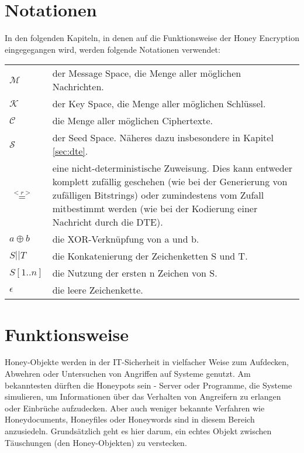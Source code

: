 \section{Notationen}

In den folgenden Kapiteln, in denen auf die Funktionsweise der Honey Encryption eingegegangen wird, werden folgende Notationen verwendet:

\begin{tabular}{lp{14cm}}
\(\mathcal{M}\) & der Message Space, die Menge aller möglichen Nachrichten. \\ 
\(\mathcal{K}\) & der Key Space, die Menge aller möglichen Schlüssel. \\ 
\(\mathcal{C}\) & die Menge aller möglichen Ciphertexte. \\ 
\(\mathcal{S}\) & der Seed Space. Näheres dazu insbesondere in Kapitel \ref{sec:dte}. \\ 
\(\overset{<r>}{=}\) & eine nicht-deterministische Zuweisung. Dies kann entweder komplett zufällig geschehen (wie bei der Generierung von zufälligen Bitstrings) oder zumindestens vom Zufall mitbestimmt werden (wie bei der Kodierung einer Nachricht durch die DTE). \\ 
\(a \oplus b\) & die XOR-Verknüpfung von a und b. \\ 
\(S || T\) & die Konkatenierung der Zeichenketten S und T. \\ 
\(S{[1..n]}\) & die Nutzung der ersten n Zeichen von S. \\ 
\(\epsilon\) & die leere Zeichenkette. \\ 
\end{tabular}

\newpage

\section{Funktionsweise}
\label{sec:funktionsweise}

Honey-Objekte werden in der IT-Sicherheit in vielfacher Weise zum Aufdecken, Abwehren oder Untersuchen von Angriffen auf Systeme genutzt. Am bekanntesten dürften die Honeypots sein - Server oder Programme, die Systeme simulieren, um Informationen über das Verhalten von Angreifern zu erlangen oder Einbrüche aufzudecken. Aber auch weniger bekannte Verfahren wie Honeydocuments, Honeyfiles oder Honeywords sind in diesem Bereich anzusiedeln. Grundsätzlich geht es hier darum, ein echtes Objekt zwischen Täuschungen (den Honey-Objekten) zu verstecken. 

